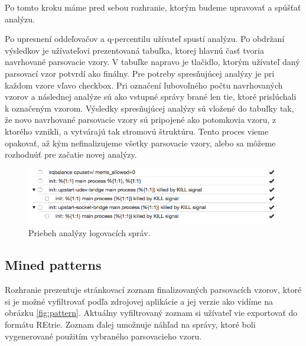Po tomto kroku máme pred sebou rozhranie, ktorým budeme upravovať a spúšťať analýzu.
\par Po upresnení oddeľovačov a q-percentilu užívateľ spustí analýzu. Po obdržaní výsledkov je užívateľovi prezentovaná tabuľka, ktorej hlavnú časť tvoria navrhované parsovacie vzory. V tabuľke napravo je tlačidlo, ktorým užívateľ daný parsovací vzor potvrdí ako finálny. Pre potreby spresňujúcej analýzy je pri každom vzore vľavo checkbox. Pri označení ľubovoľného počtu navrhovaných vzorov a následnej analýze sú ako vstupné správy brané len tie, ktoré prislúchali k označeným vzorom. Výsledky spresňujúcej analýzy sú vložené do tabuľky tak, že novo navrhované parsovacie vzory sú pripojené ako potomkovia vzoru, z ktorého vznikli, a vytvárajú tak stromovú štruktúru. Tento proces vieme opakovať, až kým nefinalizujeme všetky parsovacie vzory, alebo sa môžeme rozhodnúť pre začatie novej analýzy.

\begin{figure}[htbp]
 \centering 
 \begin{minipage}{0.95\linewidth}
 	\centering
 	\includegraphics[width=\textwidth]{Images/thesis-miner-analysis.png}
 \end{minipage}
  \caption{Priebeh analýzy logovacích správ.}
  \label{fig:miner-source}
\end{figure}

\subsection{Mined patterns}
Rozhranie prezentuje stránkovací zoznam finalizovaných parsovacích vzorov, ktoré si je možné vyfiltrovať podľa zdrojovej aplikácie a jej verzie ako vidíme na obrázku \ref{fig:pattern}. Aktuálny vyfiltrovaný zoznam si užívateľ vie exportovať do formátu REtrie. Zoznam ďalej umožnuje náhľad na správy, ktoré boli vygenerované použitím vybraného parsovacieho vzoru.

